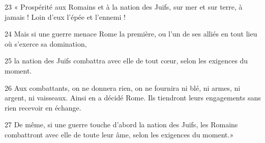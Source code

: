 23 « Prospérité aux Romains et à la nation des Juifs, sur mer et sur terre, à jamais ! Loin d’eux l’épée et l’ennemi !

24 Mais si une guerre menace Rome la première, ou l’un de ses alliés en tout lieu où s’exerce sa domination,

25 la nation des Juifs combattra avec elle de tout cœur, selon les exigences du moment.

26 Aux combattants, on ne donnera rien, on ne fournira ni blé, ni armes, ni argent, ni vaisseaux. Ainsi en a décidé Rome. Ils tiendront leurs engagements sans rien recevoir en échange.

27 De même, si une guerre touche d’abord la nation des Juifs, les Romains combattront avec elle de toute leur âme, selon les exigences du moment.»